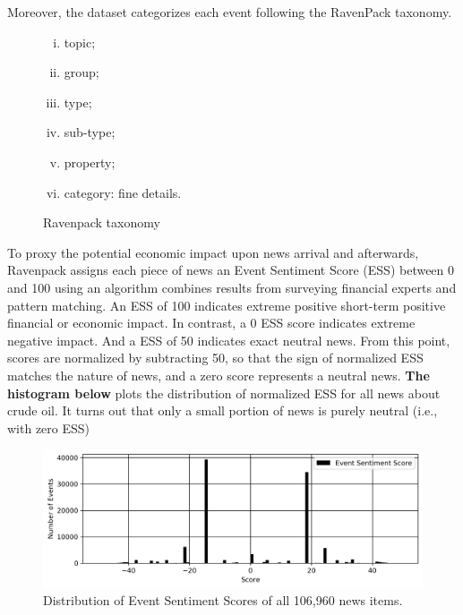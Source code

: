 \documentclass[12pt]{article}
\begin{document}
	\par Moreover, the dataset categorizes each event following the RavenPack taxonomy.
	\begin{figure}[H]
		\centering
		\small
		\begin{enumerate}[(i)]
			\item topic;
			\item group;
			\item type;
			\item sub-type;
			\item property;
			\item category: fine details.
		\end{enumerate}
		\caption{Ravenpack taxonomy}
	\end{figure}
	 
	\par To proxy the potential economic impact upon news arrival and afterwards, Ravenpack assigns each piece of news an Event Sentiment Score (ESS) between 0 and 100 using an algorithm combines results from surveying financial experts and pattern matching. An ESS of 100 indicates extreme positive short-term positive financial or economic impact. In contrast, a 0 ESS score indicates extreme negative impact. And a ESS of 50 indicates exact neutral news. From this point, scores are normalized by subtracting 50, so that the sign of normalized ESS matches the nature of news, and a zero score represents a neutral news. \textbf{The histogram below} plots the distribution of normalized ESS for all news about crude oil. It turns out that only a small portion of news is purely neutral (i.e., with zero ESS)
	\begin{figure}[H]
		\centering
		\small
		\includegraphics[width=\linewidth]{figures/event_classification/hist_ess_all.png}
		\caption{Distribution of Event Sentiment Scores of all 106,960 news items.}
	\end{figure}
\end{document}
